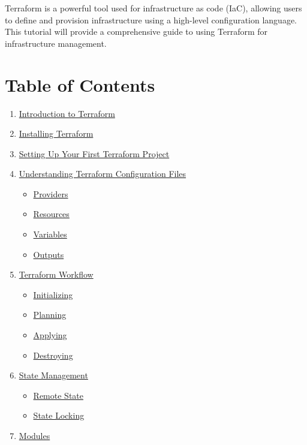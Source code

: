 \documentclass[
  letterpaper,
  DIV=11,
  numbers=noendperiod]{scrreprt}
\providecommand{\tightlist}{%
  \setlength{\itemsep}{0pt}\setlength{\parskip}{0pt}}\usepackage{longtable,booktabs,array}
\begin{document}
Terraform is a powerful tool used for infrastructure as code (IaC),
allowing users to define and provision infrastructure using a high-level
configuration language. This tutorial will provide a comprehensive guide
to using Terraform for infrastructure management.

\section{Table of Contents}\label{table-of-contents-22}

\begin{enumerate}
\def\labelenumi{\arabic{enumi}.}
\tightlist
\item
  \hyperref[introduction-to-terraform]{Introduction to Terraform}
\item
  \hyperref[installing-terraform]{Installing Terraform}
\item
  \hyperref[setting-up-your-first-terraform-project]{Setting Up Your
  First Terraform Project}
\item
  \hyperref[understanding-terraform-configuration-files]{Understanding
  Terraform Configuration Files}

  \begin{itemize}
  \tightlist
  \item
    \hyperref[providers]{Providers}
  \item
    \hyperref[resources]{Resources}
  \item
    \hyperref[variables]{Variables}
  \item
    \hyperref[outputs]{Outputs}
  \end{itemize}
\item
  \hyperref[terraform-workflow]{Terraform Workflow}

  \begin{itemize}
  \tightlist
  \item
    \hyperref[initializing]{Initializing}
  \item
    \hyperref[planning]{Planning}
  \item
    \hyperref[applying]{Applying}
  \item
    \hyperref[destroying]{Destroying}
  \end{itemize}
\item
  \hyperref[state-management]{State Management}

  \begin{itemize}
  \tightlist
  \item
    \hyperref[remote-state]{Remote State}
  \item
    \hyperref[state-locking]{State Locking}
  \end{itemize}
\item
  \hyperref[modules]{Modules}


\end{enumerate}
\end{document}

